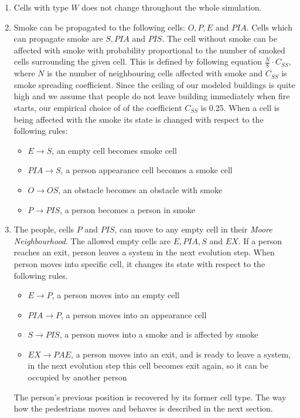 \begin{enumerate}
    \item Cells with type $W$ does not change throughout the whole simulation.
    \item Smoke can be propagated to the following cells: $O, P, E$ and $PIA$.
    Cells which can propagate smoke are $S,PIA$ and $PIS$. The cell without
    smoke can be affected with smoke with probability proportional to the
    number of smoked cells surrounding the given cell. This is defined by
    following equation $\frac{N}{8} \cdot C_{SS}$, where $N$ is the number of
    neighbouring cells affected with smoke and $C_{SS}$ is smoke spreading
    coefficient. Since the ceiling of our modeled buildings is quite high and
    we assume that people do not leave building immediately when fire
    starts, our empirical choice of of the coefficient $C_{SS}$ is 0.25.
    When a cell is being affected with the smoke its state is changed with
    respect to the following rules:
    \begin{itemize}
        \item $E \rightarrow S$, an empty cell becomes smoke cell
        \item $PIA \rightarrow S$, a person appearance cell becomes a smoke cell
        \item $O \rightarrow OS$, an obstacle becomes an obstacle with smoke
        \item $P \rightarrow PIS$, a person becomes a person in smoke
    \end{itemize}
    \item The people, cells $P$ and $PIS$, can move to any empty cell in their
    \emph{Moore Neighbourhood}. The allowed empty cells are $E,PIA,S$ and $EX$.
    If a person reaches an exit, person leaves a system in the next evolution
    step. When person moves into specific cell, it changes its state with
    respect to the following rules.
    \begin{itemize}
        \item $E \rightarrow P$, a person moves into an empty cell
        \item $PIA \rightarrow P$, a person moves into an appearance cell
        \item $S \rightarrow PIS$, a person moves into a smoke and is affected
        by smoke
        \item $EX \rightarrow PAE$, a person moves into an exit, and is
        ready to leave a system, in the next evolution step this cell becomes
        exit again, so it can be occupied by another person
    \end{itemize}
    The person's previous position is recovered by its former cell type. The
    way how the pedestrians moves and behaves is described in the next section.
\end{enumerate}

